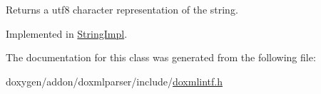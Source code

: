 Returns a utf8 character representation of the string. 

Implemented in \mbox{\hyperlink{class_string_impl_a9e7c386a3cd20feb6dea3d98b559535c}{String\+Impl}}.



The documentation for this class was generated from the following file\+:\begin{DoxyCompactItemize}
\item 
doxygen/addon/doxmlparser/include/\mbox{\hyperlink{include_2doxmlintf_8h}{doxmlintf.\+h}}\end{DoxyCompactItemize}
